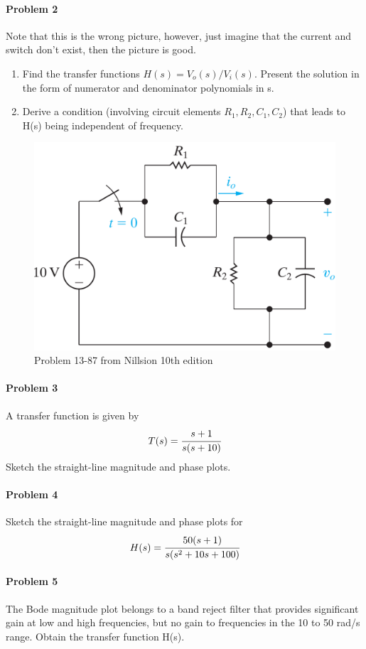 {\paragraph{Problem 2}
Note that this is the wrong picture, however, just imagine that the current and switch don't exist, then the picture is good. %
\begin{enumerate}[label=\alph*)]
	\item Find the transfer functions $H(s) =V_o(s)/V_i(s)$. Present the solution in the form of numerator and denominator polynomials in s.
	\item Derive a condition (involving circuit elements $R_1, R_2, C_1, C_2$) that leads to H(s) being independent of frequency. 
\end{enumerate}
\begin{figure}[H]
	\centering
	\includegraphics[width=1\linewidth]{images/Nil10th13-87}
	\caption{Problem 13-87 from Nillsion 10th edition}
	\label{fig:nil10th13-87}
\end{figure}
\paragraph{Problem 3}
A transfer function is given by
\[
T(s)= \cfrac{s+1}{s(s+10)}
\]
Sketch the straight-line magnitude and phase plots. 

\paragraph{Problem 4}
Sketch the straight-line magnitude and phase plots for
\[
H(s)=\cfrac{50(s+1)}{s(s^2+10s+100)}
\]
\paragraph{Problem 5}
The Bode magnitude plot belongs to a band reject filter that provides significant gain at low and high frequencies, but no gain to frequencies in the 10 to 50 rad/s range. Obtain the transfer function H(s). 


}
